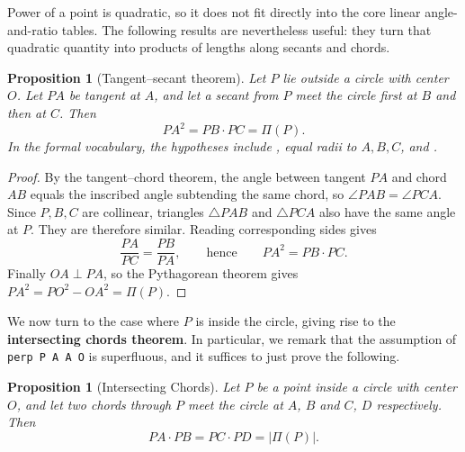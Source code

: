 \documentclass[reqno]{amsart}
\newcommand{\codeseg}[1]{%
    \begingroup
    \setlength{\fboxsep}{1.5pt}%
    \colorbox{agcodebg}{\texttt{\detokenize{#1}}}%
    \endgroup
}
\DeclareMathOperator{\1}{\textbf{1}}
\newtheorem{prop}[thm]{Proposition}
\begin{document}
Power of a point is quadratic, so it does not fit directly into the core
linear angle-and-ratio tables.  The following results are nevertheless useful:
they turn that quadratic quantity into products of lengths along secants and
chords.

\begin{prop}[Tangent--secant theorem]
Let \(P\) lie outside a circle with center \(O\).  Let \(PA\) be tangent at
\(A\), and let a secant from \(P\) meet the circle first at \(B\) and then at
\(C\).  Then
\[
    PA^2=PB\cdot PC=\Pi(P).
\]
In the formal vocabulary, the hypotheses include
\codeseg{perp P A A O}, equal radii to \(A,B,C\), and
\codeseg{coll P B C}.
\end{prop}

\begin{proof}
By the tangent--chord theorem, the angle between tangent \(PA\) and chord
\(AB\) equals the inscribed angle subtending the same chord, so
\(\angle PAB=\angle PCA\).  Since \(P,B,C\) are collinear, triangles
\(\triangle PAB\) and \(\triangle PCA\) also have the same angle at \(P\).
They are therefore similar.  Reading corresponding sides gives
\[
    \frac{PA}{PC}=\frac{PB}{PA},
    \qquad\text{hence}\qquad
    PA^2=PB\cdot PC.
\]
Finally \(OA\perp PA\), so the Pythagorean theorem gives
\(PA^2=PO^2-OA^2=\Pi(P)\).
\end{proof}

We now turn to the case where $P$ is inside the circle, giving rise to the \textbf{intersecting chords theorem}. 
In particular, we remark that the assumption of \verb|perp P A A O| is superfluous, and it suffices to just prove the 
following. 

\begin{prop}[Intersecting Chords]
Let $P$ be a point inside a circle with center $O$, and let two chords through $P$ meet the circle at $A$, $B$ and $C$, $D$ respectively. Then
\[
    PA \cdot PB = PC \cdot PD = |\Pi(P)|.
\]
\end{prop}
\end{document}
